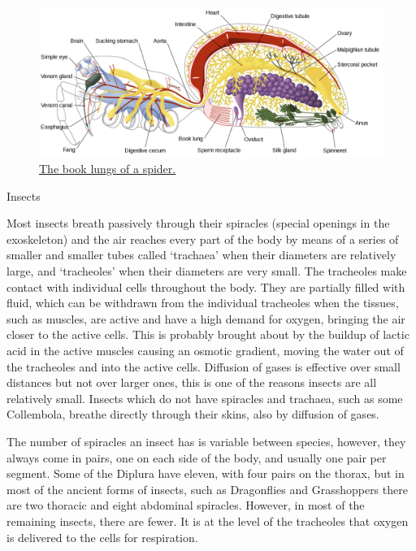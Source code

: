 \begin{figure}

{\centering \includegraphics[width=0.7\linewidth]{./figures/respiratory/Spider_internal_anatomy-en} 

}

\caption{\href{https://upload.wikimedia.org/wikipedia/commons/2/22/Spider_internal_anatomy-en.svg}{The book lungs of a spider.}}\label{fig:spiderbooklkung}
\end{figure}

Insects

Most insects breath passively through their spiracles (special openings in the exoskeleton) and the air reaches every part of the body by means of a series of smaller and smaller tubes called `trachaea' when their diameters are relatively large, and `tracheoles' when their diameters are very small. The tracheoles make contact with individual cells throughout the body. They are partially filled with fluid, which can be withdrawn from the individual tracheoles when the tissues, such as muscles, are active and have a high demand for oxygen, bringing the air closer to the active cells. This is probably brought about by the buildup of lactic acid in the active muscles causing an osmotic gradient, moving the water out of the tracheoles and into the active cells. Diffusion of gases is effective over small distances but not over larger ones, this is one of the reasons insects are all relatively small. Insects which do not have spiracles and trachaea, such as some Collembola, breathe directly through their skins, also by diffusion of gases.

The number of spiracles an insect has is variable between species, however, they always come in pairs, one on each side of the body, and usually one pair per segment. Some of the Diplura have eleven, with four pairs on the thorax, but in most of the ancient forms of insects, such as Dragonflies and Grasshoppers there are two thoracic and eight abdominal spiracles. However, in most of the remaining insects, there are fewer. It is at the level of the tracheoles that oxygen is delivered to the cells for respiration.

